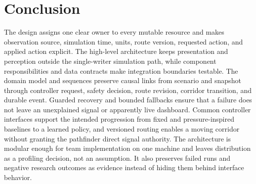 \section{Conclusion}

The design assigns one clear owner to every mutable resource and makes observation source, simulation time, units, route version, requested action, and applied action explicit. The high-level architecture keeps presentation and perception outside the single-writer simulation path, while component responsibilities and data contracts make integration boundaries testable. The domain model and sequences preserve causal links from scenario and snapshot through controller request, safety decision, route revision, corridor transition, and durable event. Guarded recovery and bounded fallbacks ensure that a failure does not leave an unexplained signal or apparently live dashboard. Common controller interfaces support the intended progression from fixed and pressure-inspired baselines to a learned policy, and versioned routing enables a moving corridor without granting the pathfinder direct signal authority. The architecture is modular enough for team implementation on one machine and leaves distribution as a profiling decision, not an assumption. It also preserves failed runs and negative research outcomes as evidence instead of hiding them behind interface behavior.
